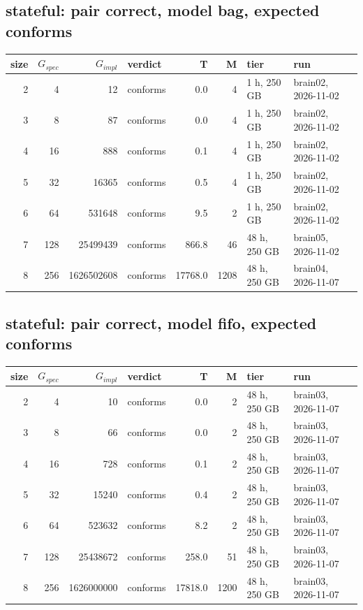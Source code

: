 \documentclass[10pt]{article}
\begin{document}
\subsection*{stateful: pair \textsf{correct}, model bag, expected conforms}
\begin{longtable}{@{}rrrlrrll@{}}
\toprule
size & $G_{\mathit{spec}}$ & $G_{\mathit{impl}}$ & verdict & T & M & tier & run \\
\midrule
\endhead
\color{blue} 2 & 4 & 12 & conforms & 0.0 & 4 & 1 h, 250 GB & brain02, 2026-11-02 \\
\color{blue} 3 & 8 & 87 & conforms & 0.0 & 4 & 1 h, 250 GB & brain02, 2026-11-02 \\
\color{blue} 4 & 16 & 888 & conforms & 0.1 & 4 & 1 h, 250 GB & brain02, 2026-11-02 \\
\color{blue} 5 & 32 & 16365 & conforms & 0.5 & 4 & 1 h, 250 GB & brain02, 2026-11-02 \\
\color{blue} 6 & 64 & 531648 & conforms & 9.5 & 2 & 1 h, 250 GB & brain02, 2026-11-02 \\
\color{blue} 7 & 128 & 25499439 & conforms & 866.8 & 46 & 48 h, 250 GB & brain05, 2026-11-02 \\
\color{blue} 8 & 256 & 1626502608 & conforms & 17768.0 & 1208 & 48 h, 250 GB & brain04, 2026-11-07 \\
\bottomrule
\end{longtable}
\subsection*{stateful: pair \textsf{correct}, model fifo, expected conforms}
\begin{longtable}{@{}rrrlrrll@{}}
\toprule
size & $G_{\mathit{spec}}$ & $G_{\mathit{impl}}$ & verdict & T & M & tier & run \\
\midrule
\endhead
\color{blue} 2 & 4 & 10 & conforms & 0.0 & 2 & 48 h, 250 GB & brain03, 2026-11-07 \\
\color{blue} 3 & 8 & 66 & conforms & 0.0 & 2 & 48 h, 250 GB & brain03, 2026-11-07 \\
\color{blue} 4 & 16 & 728 & conforms & 0.1 & 2 & 48 h, 250 GB & brain03, 2026-11-07 \\
\color{blue} 5 & 32 & 15240 & conforms & 0.4 & 2 & 48 h, 250 GB & brain03, 2026-11-07 \\
\color{blue} 6 & 64 & 523632 & conforms & 8.2 & 2 & 48 h, 250 GB & brain03, 2026-11-07 \\
\color{blue} 7 & 128 & 25438672 & conforms & 258.0 & 51 & 48 h, 250 GB & brain03, 2026-11-07 \\
\color{blue} 8 & 256 & 1626000000 & conforms & 17818.0 & 1200 & 48 h, 250 GB & brain03, 2026-11-07 \\
\bottomrule
\end{longtable}
\end{document}
